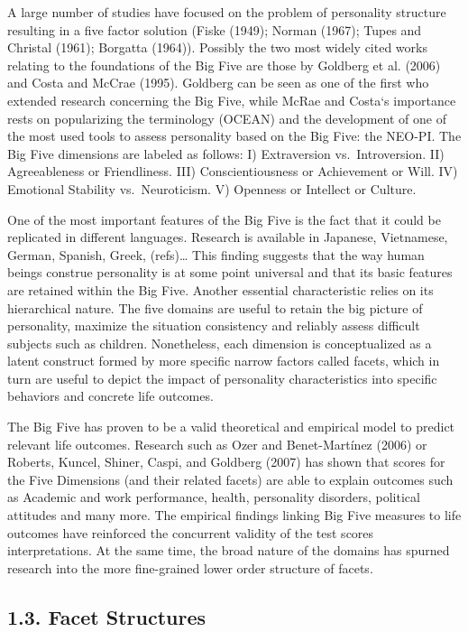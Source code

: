 \documentclass[man]{apa6}
\theoremstyle{definition}
\theoremstyle{definition}
\theoremstyle{definition}
\theoremstyle{remark}
\begin{document}
A large number of studies have focused on the problem of personality
structure resulting in a five factor solution (Fiske (1949); Norman
(1967); Tupes and Christal (1961); Borgatta (1964)). Possibly the two
most widely cited works relating to the foundations of the Big Five are
those by Goldberg et al. (2006) and Costa and McCrae (1995). Goldberg
can be seen as one of the first who extended research concerning the Big
Five, while McRae and Costa`s importance rests on popularizing the
terminology (OCEAN) and the development of one of the most used tools to
assess personality based on the Big Five: the NEO-PI. The Big Five
dimensions are labeled as follows: I) Extraversion vs.~Introversion. II)
Agreeableness or Friendliness. III) Conscientiousness or Achievement or
Will. IV) Emotional Stability vs.~Neuroticism. V) Openness or Intellect
or Culture.

One of the most important features of the Big Five is the fact that it
could be replicated in different languages. Research is available in
Japanese, Vietnamese, German, Spanish, Greek, (refs)\ldots{} This
finding suggests that the way human beings construe personality is at
some point universal and that its basic features are retained within the
Big Five. Another essential characteristic relies on its hierarchical
nature. The five domains are useful to retain the big picture of
personality, maximize the situation consistency and reliably assess
difficult subjects such as children. Nonetheless, each dimension is
conceptualized as a latent construct formed by more specific narrow
factors called facets, which in turn are useful to depict the impact of
personality characteristics into specific behaviors and concrete life
outcomes.

The Big Five has proven to be a valid theoretical and empirical model to
predict relevant life outcomes. Research such as Ozer and Benet-Martínez
(2006) or Roberts, Kuncel, Shiner, Caspi, and Goldberg (2007) has shown
that scores for the Five Dimensions (and their related facets) are able
to explain outcomes such as Academic and work performance, health,
personality disorders, political attitudes and many more. The empirical
findings linking Big Five measures to life outcomes have reinforced the
concurrent validity of the test scores interpretations. At the same
time, the broad nature of the domains has spurned research into the more
fine-grained lower order structure of facets.

\hypertarget{facet-structures}{%
\subsection{1.3. Facet Structures}\label{facet-structures}}
\end{document}
